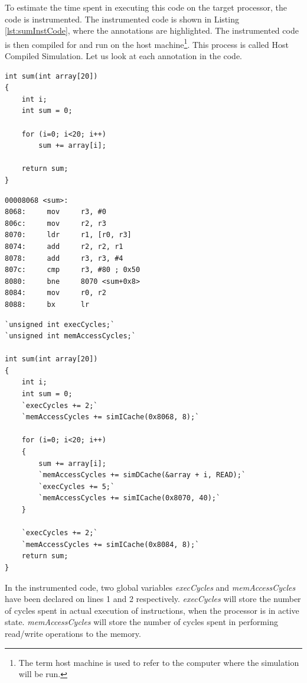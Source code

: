 To estimate the time spent in executing this code on the target processor, the code is instrumented. The instrumented code is shown in Listing \ref{lst:sumInstCode}, where the annotations are highlighted. The instrumented code is then compiled for and run on the host machine\footnote{The term host machine is used to refer to the computer where the simulation will be run.}. This process is called Host Compiled Simulation. Let us look at each annotation in the code.

\vspace*{10pt}
\begin{minipage}{0.5\textwidth}
\begin{lstlisting}[caption={Simple C Code},label={lst:sumCCode}]
int sum(int array[20])
{
	int i;
	int sum = 0;
	
	for (i=0; i<20; i++)
		sum += array[i];
	
	return sum;
}
\end{lstlisting}
\end{minipage}%
\begin{minipage}{0.5\textwidth}
\begin{lstlisting}[caption={Objdump Code},label={lst:sumObjCode}]
00008068 <sum>:
8068:     mov     r3, #0
806c:     mov     r2, r3
8070:     ldr     r1, [r0, r3]
8074:     add     r2, r2, r1
8078:     add     r3, r3, #4
807c:     cmp     r3, #80 ; 0x50
8080:     bne     8070 <sum+0x8>
8084:     mov     r0, r2
8088:     bx      lr
\end{lstlisting}
\end{minipage}
\vspace*{5pt}
\begin{lstlisting}[caption={Instrumented Code},label={lst:sumInstCode}]
`unsigned int execCycles;`
`unsigned int memAccessCycles;`

int sum(int array[20])
{
	int i;
	int sum = 0;
	`execCycles += 2;`
	`memAccessCycles += simICache(0x8068, 8);`
	
	for (i=0; i<20; i++)
	{
		sum += array[i];
		`memAccessCycles += simDCache(&array + i, READ);`
		`execCycles += 5;`
		`memAccessCycles += simICache(0x8070, 40);`
	}
	
	`execCycles += 2;`
	`memAccessCycles += simICache(0x8084, 8);`
	return sum;
}
\end{lstlisting}

In the instrumented code, two global variables \emph{execCycles} and \emph{memAccessCycles} have been declared on lines 1 and 2 respectively. \emph{execCycles} will store the number of cycles spent in actual execution of instructions, when the processor is in active state. \emph{memAccessCycles} will store the number of cycles spent in performing read/write operations to the memory.

